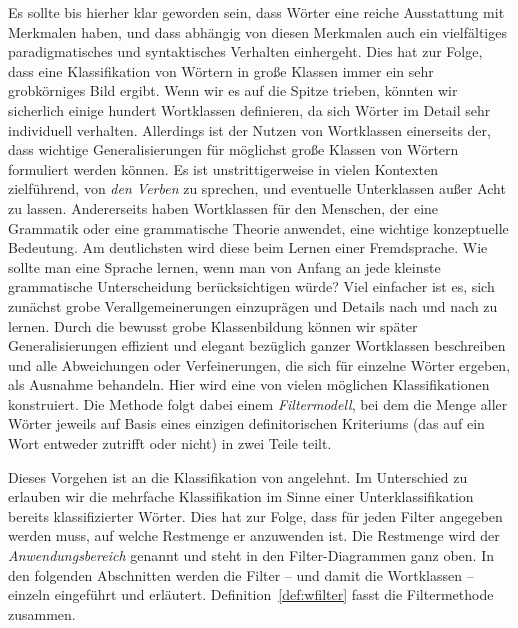\label{sec:filtermethode}

Es sollte bis hierher klar geworden sein, dass Wörter eine reiche Ausstattung mit Merkmalen haben, und dass abhängig von diesen Merkmalen auch ein vielfältiges paradigmatisches und syntaktisches Verhalten einhergeht.
Dies hat zur Folge, dass eine Klassifikation von Wörtern in große Klassen immer ein sehr grobkörniges Bild ergibt.
Wenn wir es auf die Spitze trieben, könnten wir sicherlich einige hundert Wortklassen definieren, da sich Wörter im Detail sehr individuell verhalten.
Allerdings ist der Nutzen von Wortklassen einerseits der, dass wichtige Generalisierungen für möglichst große Klassen von Wörtern formuliert werden können.
Es ist unstrittigerweise in vielen Kontexten zielführend, von \textit{den Verben} zu sprechen, und eventuelle Unterklassen außer Acht zu lassen.
Andererseits haben Wortklassen für den Menschen, der eine Grammatik oder eine grammatische Theorie anwendet, eine wichtige konzeptuelle Bedeutung.
Am deutlichsten wird diese beim Lernen einer Fremdsprache.
Wie sollte man eine Sprache lernen, wenn man von Anfang an jede kleinste grammatische Unterscheidung berücksichtigen würde?
Viel einfacher ist es, sich zunächst grobe Verallgemeinerungen einzuprägen und Details nach und nach zu lernen.
Durch die bewusst grobe Klassenbildung können wir später Generalisierungen effizient und elegant bezüglich ganzer Wortklassen beschreiben und alle Abweichungen oder Verfeinerungen, die sich für einzelne Wörter ergeben, als Ausnahme behandeln.
Hier wird eine von vielen möglichen Klassifikationen konstruiert.
Die Methode folgt dabei einem \textit{Filtermodell}, bei dem die Menge aller Wörter jeweils auf Basis eines einzigen definitorischen Kriteriums (das auf ein Wort entweder zutrifft oder nicht) in zwei Teile teilt.

Dieses Vorgehen ist an die Klassifikation von \citet{Engel09} angelehnt.
Im Unterschied zu \citet{Engel09} erlauben wir die mehrfache Klassifikation im Sinne einer Unterklassifikation bereits klassifizierter Wörter.
Dies hat zur Folge, dass für jeden Filter angegeben werden muss, auf welche Restmenge er anzuwenden ist.
Die Restmenge wird der \textit{Anwendungsbereich} genannt und steht in den Filter-Diagrammen ganz oben.
In den folgenden Abschnitten werden die Filter -- und damit die Wortklassen -- einzeln eingeführt und erläutert.
Definition~\ref{def:wfilter} fasst die Filtermethode zusammen.


